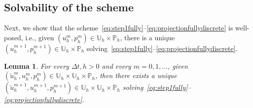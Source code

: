 \documentclass[10pt,letterpaper]{amsart}
\newcommand{\tu}{\widetilde{u}}
\newcommand{\Ph}{\mathbb{P}_h}
\newcommand{\Uh}{\mathbb{U}_h}
\newtheorem{lemma}{Lemma}[section]
\theoremstyle{definition}{\newtheorem{definition}[lemma]{Definition}}
\numberwithin{equation}{section}
\begin{document}
\subsection{Solvability of the scheme}
Next, we show that the scheme~\eqref{eq:step1fully}--\eqref{eq:projectionfullydiscrete} is well-posed, i.e., given $(u^m_h,p_h^m)\in \Uh\times\Ph$, there is a unique $(u^{m+1}_h,p_h^{m+1})\in \Uh\times\Ph$ solving~\eqref{eq:step1fully}--\eqref{eq:projectionfullydiscrete}.  
\begin{lemma}
	\label{lem:solvability}
	For every $\Delta t, h>0$ and every $m=0,1,\dots$, given $(\tu_h^m,u^m_h,p^m_h)\in \Uh\times\Uh\times\Ph$, then there exists a unique $(\tu_h^{m+1},u^{m+1}_h,p^{m+1}_h)\in \Uh\times \Uh\times\Ph$ solving~\eqref{eq:step1fully}--\eqref{eq:projectionfullydiscrete}.
\end{lemma}
\end{document}
